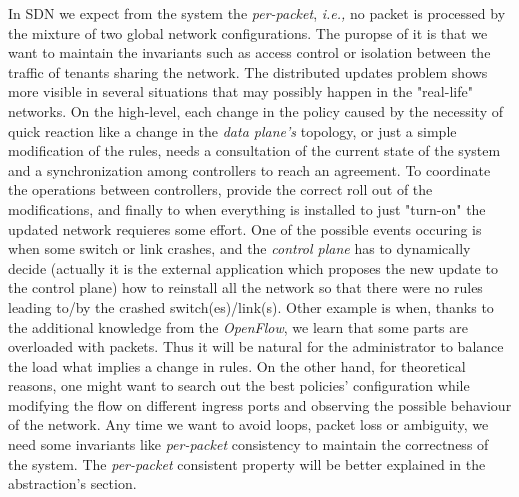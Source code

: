 \documentclass{article}
\theoremstyle{remark}
\begin{document}
In SDN we expect from the system the \emph{per-packet}, \emph{i.e.,} no packet is processed by the mixture of two global network configurations. 
The puropse of it is that we want to maintain the invariants such as access control or isolation between the traffic of tenants sharing the network\cite{Casado:2014:ASN:2661061.2661063}.
The distributed updates problem shows more visible in several situations that may possibly happen in the "real-life" networks.
On the high-level, each change in the policy caused by the necessity of quick reaction like a change in the \emph{data plane's} topology, or just a simple modification of the rules, needs a consultation of the current state of the system and a synchronization among controllers to reach an agreement. To coordinate the operations between controllers, provide the correct roll out of the modifications, and finally to when everything is installed to just "turn-on" the updated network requieres some effort.
One of the possible events occuring is when some switch or link crashes, and the \emph{control plane} has to dynamically decide (actually it is the external application which proposes the new update to the control plane) how to reinstall all the network so that there were no rules leading to/by the crashed switch(es)/link(s). 
Other example is when, thanks to the additional knowledge from the \emph{OpenFlow}, we learn that some parts are overloaded with packets. Thus it will be natural for the administrator to balance the load what implies a change in rules.
On the other hand, for theoretical reasons, one might want to search out the best policies' configuration while modifying the flow on different ingress ports and observing the possible behaviour of the network.
Any time we want to avoid loops, packet loss or ambiguity, we need some invariants like \emph{per-packet} consistency to maintain the correctness of the system.
The \emph{per-packet} consistent property will be better explained in the abstraction's section.


% 
%
\end{document}
